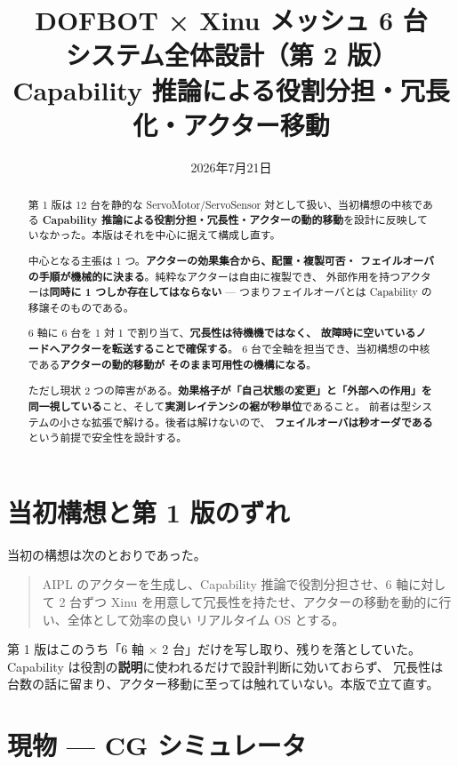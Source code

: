 \documentclass[11pt,a4paper]{article}
\title{DOFBOT × Xinu メッシュ 6 台\\ \large システム全体設計（第 2 版）\\
       \normalsize Capability 推論による役割分担・冗長化・アクター移動}
\author{}
\date{2026年7月21日}
\newcommand{\prob}[1]{\textbf{\textcolor{red!55!black}{#1}}}
\newcommand{\good}[1]{\textbf{\textcolor{green!45!black}{#1}}}
\begin{document}
\maketitle

\begin{abstract}
\noindent
第 1 版は 12 台を静的な ServoMotor/ServoSensor 対として扱い、当初構想の中核である
\textbf{Capability 推論による役割分担・冗長性・アクターの動的移動}を設計に反映して
いなかった。本版はそれを中心に据えて構成し直す。

中心となる主張は 1 つ。\good{アクターの効果集合から、配置・複製可否・
フェイルオーバの手順が機械的に決まる}。純粋なアクターは自由に複製でき、
外部作用を持つアクターは\textbf{同時に 1 つしか存在してはならない} ---
つまりフェイルオーバとは Capability の移譲そのものである。

6 軸に 6 台を 1 対 1 で割り当て、\good{冗長性は待機機ではなく、
故障時に空いているノードへアクターを転送することで確保する}。
6 台で全軸を担当でき、当初構想の中核である\textbf{アクターの動的移動が
そのまま可用性の機構になる}。

ただし現状 2 つの障害がある。\prob{効果格子が「自己状態の変更」と「外部への作用」を
同一視している}こと、そして\prob{実測レイテンシの裾が秒単位}であること。
前者は型システムの小さな拡張で解ける。後者は解けないので、
\textbf{フェイルオーバは秒オーダである}という前提で安全性を設計する。
\end{abstract}

\section{当初構想と第 1 版のずれ}

当初の構想は次のとおりであった。

\begin{quote}
AIPL のアクターを生成し、Capability 推論で役割分担させ、6 軸に対して 2 台ずつ
Xinu を用意して冗長性を持たせ、アクターの移動を動的に行い、全体として効率の良い
リアルタイム OS とする。
\end{quote}

第 1 版はこのうち「6 軸 $\times$ 2 台」だけを写し取り、残りを落としていた。
Capability は役割の\textbf{説明}に使われるだけで設計判断に効いておらず、
冗長性は台数の話に留まり、アクター移動に至っては触れていない。本版で立て直す。

\section{現物 --- CG シミュレータ}
\end{document}
